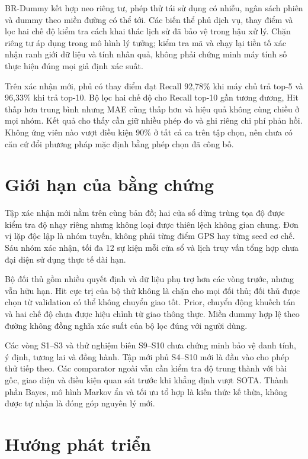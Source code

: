 BR-Dummy kết hợp neo riêng tư, phép thử tái sử dụng có nhiễu, ngân sách phiên và dummy theo miền đường có thể tới. Các biến thể phủ dịch vụ, thay điểm và lọc hai chế độ kiểm tra cách khai thác lịch sử đã bảo vệ trong hậu xử lý. Chặn riêng tư áp dụng trong mô hình lý tưởng; kiểm tra mã và chạy lại tiền tố xác nhận ranh giới dữ liệu và tính nhân quả, không phải chứng minh máy tính số thực hiện đúng mọi giả định xác suất.

Trên xác nhận mới, phủ có thay điểm đạt Recall 92,78\% khi máy chủ trả top-5 và 96,33\% khi trả top-10. Bộ lọc hai chế độ cho Recall top-10 gần tương đương, Hit thấp hơn trung bình nhưng MAE cũng thấp hơn và hiệu quả không cùng chiều ở mọi nhóm. Kết quả cho thấy cần giữ nhiều phép đo và ghi riêng chi phí phản hồi. Không ứng viên nào vượt điều kiện 90\% ở tất cả ca trên tập chọn, nên chưa có căn cứ đổi phương pháp mặc định bằng phép chọn đã công bố.

\section{Giới hạn của bằng chứng}

Tập xác nhận mới nằm trên cùng bản đồ; hai cửa sổ dừng trùng tọa độ được kiểm tra độ nhạy riêng nhưng không loại được thiên lệch không gian chung. Đơn vị lặp độc lập là nhóm tuyến, không phải từng điểm GPS hay từng seed cơ chế. Sáu nhóm xác nhận, tối đa 12 sự kiện mỗi cửa sổ và lịch truy vấn tổng hợp chưa đại diện sử dụng thực tế dài hạn.

Bộ đối thủ gồm nhiều quyết định và dữ liệu phụ trợ hơn các vòng trước, nhưng vẫn hữu hạn. Hit cực trị của bộ thử không là chặn cho mọi đối thủ; đối thủ được chọn từ validation có thể không chuyển giao tốt. Prior, chuyển động khuếch tán và hai chế độ chưa được hiệu chỉnh từ giao thông thực. Miền dummy hợp lệ theo đường không đồng nghĩa xác suất của bộ lọc đúng với người dùng.

Các vòng S1--S3 và thử nghiệm biên S9--S10 chưa chứng minh bảo vệ danh tính, ý định, tương lai và đồng hành. Tập mới phủ S4--S10 mới là đầu vào cho phép thử tiếp theo. Các comparator ngoài vẫn cần kiểm tra độ trung thành với bài gốc, giao diện và điều kiện quan sát trước khi khẳng định vượt SOTA. Thành phần Bayes, mô hình Markov ẩn và tối ưu tổ hợp là kiến thức kế thừa, không được tự nhận là đóng góp nguyên lý mới.

\section{Hướng phát triển}


